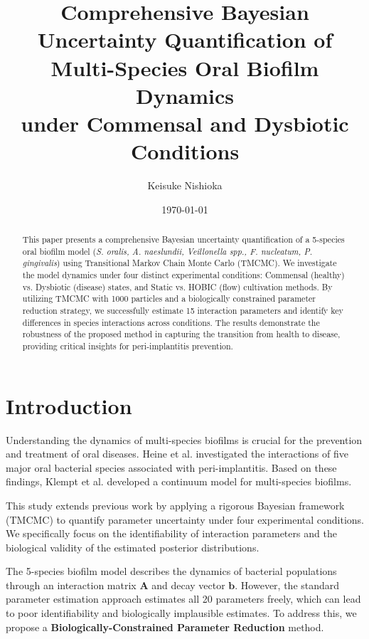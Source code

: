 \documentclass[11pt,a4paper]{article}
\title{Comprehensive Bayesian Uncertainty Quantification of\\Multi-Species Oral Biofilm Dynamics\\under Commensal and Dysbiotic Conditions}
\author{Keisuke Nishioka}
\date{\today}
\begin{document}
\maketitle

\begin{abstract}
This paper presents a comprehensive Bayesian uncertainty quantification of a 5-species oral biofilm model (\textit{S. oralis, A. naeslundii, Veillonella spp., F. nucleatum, P. gingivalis}) using Transitional Markov Chain Monte Carlo (TMCMC). We investigate the model dynamics under four distinct experimental conditions: Commensal (healthy) vs. Dysbiotic (disease) states, and Static vs. HOBIC (flow) cultivation methods. By utilizing TMCMC with 1000 particles and a biologically constrained parameter reduction strategy, we successfully estimate 15 interaction parameters and identify key differences in species interactions across conditions. The results demonstrate the robustness of the proposed method in capturing the transition from health to disease, providing critical insights for peri-implantitis prevention.
\end{abstract}

\tableofcontents
\newpage

\section{Introduction}

Understanding the dynamics of multi-species biofilms is crucial for the prevention and treatment of oral diseases. Heine et al. investigated the interactions of five major oral bacterial species associated with peri-implantitis. Based on these findings, Klempt et al. developed a continuum model for multi-species biofilms.

This study extends previous work by applying a rigorous Bayesian framework (TMCMC) to quantify parameter uncertainty under four experimental conditions. We specifically focus on the identifiability of interaction parameters and the biological validity of the estimated posterior distributions.

The 5-species biofilm model describes the dynamics of bacterial populations through an interaction matrix $\mathbf{A}$ and decay vector $\mathbf{b}$. However, the standard parameter estimation approach estimates all 20 parameters freely, which can lead to poor identifiability and biologically implausible estimates. To address this, we propose a \textbf{Biologically-Constrained Parameter Reduction} method.
\end{document}
